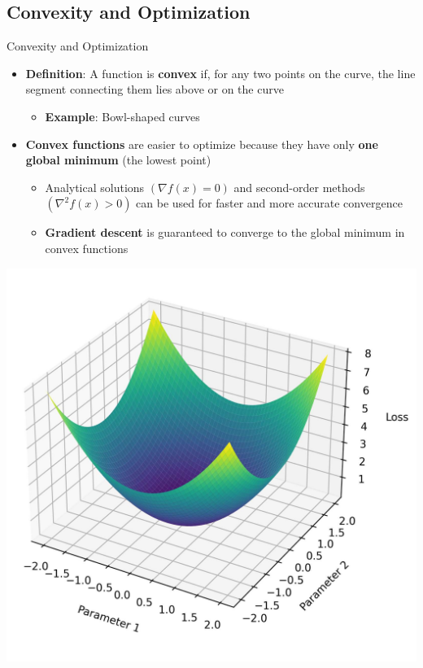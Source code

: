 \documentclass[serif, aspectratio=169]{beamer}
\begin{document}
\subsection{Convexity and Optimization}
\begin{frame}{Convexity and Optimization}
    \begin{minipage}{0.6\linewidth}
        \begin{itemize}
            \item \textbf{Definition}: A function is \textbf{convex} if, for any two points on the curve, the line segment connecting them lies above or on the curve
            \begin{itemize}
                \item \textbf{Example}: Bowl-shaped curves
            \end{itemize}
            \item \textbf{Convex functions} are easier to optimize because they have only \textbf{one global minimum} (the lowest point)
            \begin{itemize}
                \item Analytical solutions $(\nabla f(x) = 0)$ and second-order methods $(\nabla^2 f(x) > 0)$ can be used for faster and more accurate convergence
                \item \textbf{Gradient descent} is guaranteed to converge to the global minimum in convex functions
            \end{itemize}
        \end{itemize}
    \end{minipage}%
    \hfill
    \begin{minipage}{0.4\linewidth}
        \centering
        \includegraphics[height=.6\textheight]{pic/loss_convex.jpg}
    \end{minipage}
\end{frame}
\end{document}

